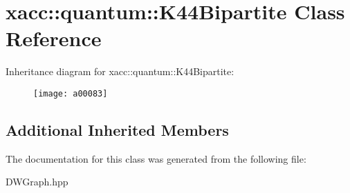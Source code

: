 \hypertarget{a00083}{}\section{xacc\+:\+:quantum\+:\+:K44\+Bipartite Class Reference}
\label{a00083}
Inheritance diagram for xacc\+:\+:quantum\+:\+:K44\+Bipartite\+:\begin{figure}[H]
\begin{center}
\leavevmode
\texttt{[image: a00083]}
\end{center}
\end{figure}
\subsection*{Additional Inherited Members}


The documentation for this class was generated from the following file\+:\begin{DoxyCompactItemize}
\item 
D\+W\+Graph.\+hpp\end{DoxyCompactItemize}
